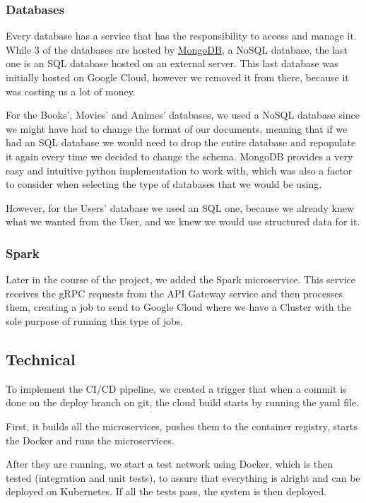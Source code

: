 \documentclass[oneside]{article}
\newcommand*\fpar{\hspace{1ex}}
\begin{document}
    \subsubsection{Databases}
    \fpar Every database has a service that has the responsibility to access and manage it. While 3 of the databases are hosted by \href{https://www.mongodb.com/}{MongoDB}, a NoSQL database, the last one is an SQL database hosted on an external server. This last database was initially hosted on Google Cloud, however we removed it from there, because it was costing us a lot of money.
    \par For the Books', Movies' and Animes' databases, we used a NoSQL database since we might have had to change the format of our documents, meaning that if we had an SQL database we would need to drop the entire database and repopulate it again every time we decided to change the schema. MongoDB provides a very easy and intuitive python implementation to work with, which was also a factor to consider when selecting the type of databases that we would be using.
    \par However, for the Users' database we used an SQL one, because we already knew what we wanted from the User, and we knew we would use structured data for it.

    \subsubsection{Spark}
    \fpar Later in the course of the project, we added the Spark microservice. This service receives the gRPC requests from the API Gateway service and then processes them, creating a job to send to Google Cloud where we have a Cluster with the sole purpose of running this type of jobs.

  \subsection{Technical}
  \fpar To implement the CI/CD pipeline, we created a trigger that when a commit is done on the deploy branch on git, the cloud build starts by running the yaml file. 
  \par First, it builds all the microservices, pushes them to the container registry, starts the Docker and runs the microservices. 
  \par After they are running, we start a test network using Docker, which is then tested (integration and unit tests), to assure that everything is alright and can be deployed on Kubernetes. If all the tests pass, the system is then deployed.
\end{document}
